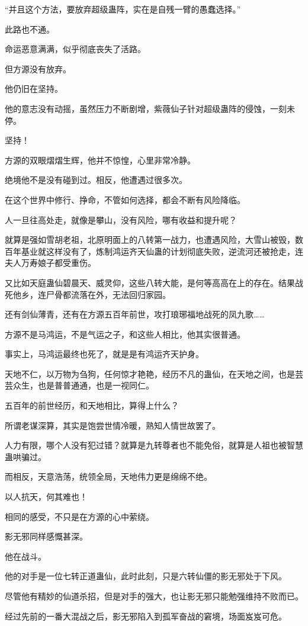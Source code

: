 \begin{this_body}
“并且这个方法，要放弃超级蛊阵，实在是自残一臂的愚蠢选择。”

此路也不通。

命运恶意满满，似乎彻底丧失了活路。

但方源没有放弃。

他仍旧在坚持。

他的意志没有动摇，虽然压力不断剧增，紫薇仙子针对超级蛊阵的侵蚀，一刻未停。

坚持！

方源的双眼熠熠生辉，他并不惊惶，心里非常冷静。

绝境他不是没有碰到过。相反，他遭遇过很多次。

在这个世界中修行、挣命，不管如何选择，都会不断有风险降临。

人一旦往高处走，就像是攀山，没有风险，哪有收益和提升呢？

就算是强如雪胡老祖，北原明面上的八转第一战力，也遭遇风险，大雪山被毁，数百年基业就这样没有了，炼制鸿运齐天仙蛊的计划彻底失败，逆流河还被抢走，连夫人万寿娘子都受重伤。

又比如天庭蛊仙碧晨天、威灵仰，这些八转大能，是何等高高在上的存在。结果战死他乡，连尸骨都流落在外，无法回归家园。

还有剑仙薄青，还有在方源五百年前世，攻打琅琊福地战死的凤九歌……

方源不是马鸿运，不是气运之子，和这些人相比，他其实很普通。

事实上，马鸿运最终也死了，就是是有鸿运齐天护身。

天地不仁，以万物为刍狗，任何惊才艳艳，经历不凡的蛊仙，在天地之间，也是芸芸众生，也是普普通通，也是一视同仁。

五百年的前世经历，和天地相比，算得上什么？

所谓老谋深算，其实是饱尝世情冷暖，熟知人情世故罢了。

人力有限，哪个人没有犯过错？就算是九转尊者也不能免俗，就算是人祖也被智慧蛊哄骗过。

而相反，天意浩荡，统领全局，天地伟力更是绵绵不绝。

以人抗天，何其难也！

相同的感受，不只是在方源的心中萦绕。

影无邪同样感慨甚深。

他在战斗。

他的对手是一位七转正道蛊仙，此时此刻，只是六转仙僵的影无邪处于下风。

尽管他有精妙的仙道杀招，但是对手的强大，也让影无邪只能勉强维持不败而已。

经过先前的一番大混战之后，影无邪陷入到孤军奋战的窘境，场面岌岌可危。


\end{this_body}

